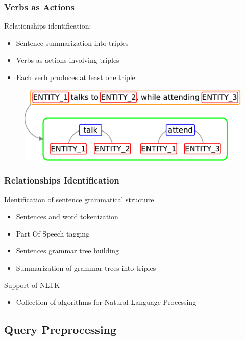 \documentclass{beamer}
\begin{document}
\begin{frame}
\frametitle{Verbs as Actions}
Relationships identification:\\
\begin{itemize}
\item Sentence summarization into triples
\item Verbs as actions involving triples
\item Each verb produces at least one triple
\end{itemize}
\medskip
\begin{figure}
\includegraphics[scale=0.43]{imgs/sentsum}
\end{figure}
\end{frame}

\begin{frame}
\frametitle{Relationships Identification}
Identification of sentence grammatical structure\\
\begin{itemize}
\item Sentences and word tokenization
\item Part Of Speech tagging
\item Sentences grammar tree building
\item Summarization of grammar trees into triples
\end{itemize}
\bigskip
Support of NLTK\\
\begin{itemize}
\item Collection of algorithms for Natural Language Processing
\end{itemize}
\end{frame}

\subsection{Query Preprocessing}
\end{document}
